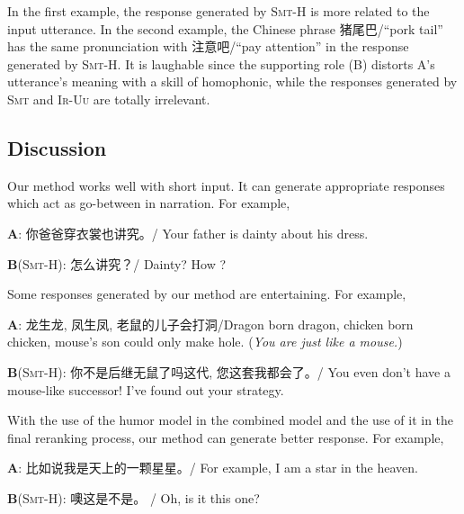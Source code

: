 \documentclass[letterpaper]{article} %
\begin{document}
\begin{CJK*}{UTF8}{gbsn}
In the first example, the response generated by \textsc{Smt-H} is more related to the input utterance. In the second example, the Chinese phrase 猪尾巴/``pork tail'' has the same pronunciation with 注意吧/``pay attention'' in the response generated by \textsc{Smt-H}. It is laughable since the supporting role (B) distorts A's utterance's meaning with a skill of homophonic, while the responses generated by \textsc{Smt} and \textsc{Ir-Uu} are totally irrelevant. 

\subsection{Discussion}

Our method works well with short input. It can generate appropriate responses which act as go-between in narration. For example,

\textbf{A}: 你爸爸穿衣裳也讲究。/ Your father is dainty about his dress. 

\textbf{B}(\textsc{Smt-H}): 怎么讲究？/ Dainty? How ?

Some responses generated by our method are entertaining. For example,

\textbf{A}: 龙生龙, 凤生凤, 老鼠的儿子会打洞/Dragon born dragon, chicken born chicken, mouse's son could only make hole. (\textit{You are just like a mouse.}) 

\textbf{B}(\textsc{Smt-H}): 你不是后继无鼠了吗这代, 您这套我都会了。/ You even don't have a mouse-like successor! I've found out your strategy.

%
%
%
%

With the use of the humor model in the combined model and the use of it in the final reranking process, our method can generate better response. For example,

\textbf{A}: 比如说我是天上的一颗星星。/ For example, I am a star in the heaven.

\textbf{B}(\textsc{Smt-H}): 噢这是不是。 / Oh, is it this one?


\end{CJK*}
\end{document}
